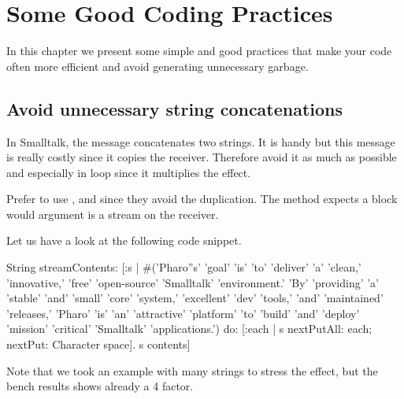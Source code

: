 \documentclass[a4paper,10pt,twoside]{book}
\begin{document}
	\sloppy
\fi



\chapter{Some Good Coding Practices}


In this chapter we present some simple and good practices that make your code often more efficient and 
avoid generating unnecessary garbage. 

\section{Avoid unnecessary string concatenations}

In Smalltalk, the message \ct{,}  concatenates two strings. It is handy but this message is really costly since it copies the receiver. Therefore avoid it as much as possible and especially in loop since it multiplies the effect. 

Prefer to use  ,  and  since they avoid the duplication. The method  expects a block would argument is a stream on the receiver. 

Let us have a look at the following code snippet. 
\begin{code}{}
String streamContents: [:s |
 #('Pharo''s' 'goal' 'is' 'to' 'deliver' 'a' 'clean,' 'innovative,' 'free' 'open-source' 'Smalltalk' 'environment.' 'By' 'providing' 'a' 'stable' 'and' 'small' 'core' 'system,' 'excellent' 'dev' 'tools,' 'and' 'maintained' 'releases,' 'Pharo' 'is' 'an' 'attractive' 'platform' 'to' 'build' 'and' 'deploy' 'mission' 'critical' 'Smalltalk' 'applications.')
 	do: [:each | s nextPutAll: each; nextPut: Character space].
	s contents] 
\end{code}

Note that we took an example with many strings to stress the effect, but the bench results shows already a 4 factor. 
\end{document}
